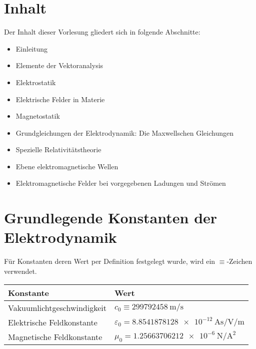 \section{Inhalt}

Der Inhalt dieser Vorlesung gliedert sich in folgende Abschnitte:

\begin{itemize}
	\item Einleitung

	\item Elemente der Vektoranalysis

	\item Elektrostatik

	\item Elektrische Felder in Materie

	\item Magnetostatik

	\item Grundgleichungen der Elektrodynamik: Die Maxwellschen Gleichungen

	\item Spezielle Relativitätstheorie

	\item Ebene elektromagnetische Wellen

	\item Elektromagnetische Felder bei vorgegebenen Ladungen und Strömen
\end{itemize}



\section{Grundlegende Konstanten der Elektrodynamik}

Für Konstanten deren Wert per Definition festgelegt wurde, wird ein $\equiv $-Zeichen verwendet.


\begin{table}[H]
	\centering
	\begin{tabular}{|l|l|} \hline
		\textbf{Konstante}         & \textbf{Wert}                                                     \\\hline
		Vakuumlichtgeschwindigkeit & \centering\arraybackslash{}$c_{0}\equiv \SI{299792458}{\m\per\s}$ \\
		Elektrische Feldkonstante  & $\varepsilon _{0}=\SI{8,8541878128e-12}{\A\s\per\V\per\m}$        \\
		Magnetische Feldkonstante  & $\mu _{0}=\SI{1,25663706212e-6}{\N\per\square\A}$                 \\
		\hline
	\end{tabular}
\end{table}




